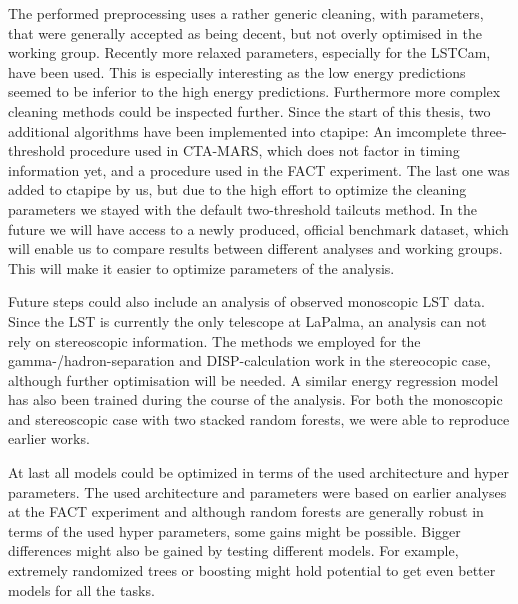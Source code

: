 The performed preprocessing uses a rather generic cleaning, with
parameters, that were generally accepted as being 
decent, but not overly optimised in the working group. Recently 
more relaxed parameters, especially for the LSTCam, have been used.
This is especially interesting as the low energy predictions 
seemed to be inferior to the high energy predictions.
Furthermore more complex cleaning methods could be inspected further.
Since the start of this thesis, two additional algorithms have been 
implemented into ctapipe:
An imcomplete three-threshold procedure used in CTA-MARS, which does not factor 
in timing information yet, and a procedure used in the FACT experiment.
The last one was added to ctapipe by us, but due to the high effort to
optimize the cleaning parameters we stayed with the default 
two-threshold tailcuts method.
In the future we will have access to a newly produced, official 
benchmark dataset, which will enable us to compare results between 
different analyses and working groups.
This will make it easier to optimize parameters of the analysis.

Future steps could also include an analysis of observed monoscopic 
LST data. Since the LST is currently the only telescope 
at LaPalma, an analysis can not rely on stereoscopic information.
The methods we employed for the gamma-/hadron-separation and 
DISP-calculation work in the stereocopic case, although further
optimisation will be needed.
A similar energy regression model has also been trained during the course
of the analysis. For both the monoscopic and stereoscopic case with
two stacked random forests, we were able to reproduce earlier works.

At last all models could be optimized in terms of the used architecture and
hyper parameters. The used architecture and parameters were based on earlier analyses 
at the FACT experiment and although random forests are generally 
robust in terms of the used hyper parameters, some gains might be 
possible.
Bigger differences might also be gained by testing different models.
For example, extremely randomized trees or boosting might hold
potential to get even better models for all the tasks.